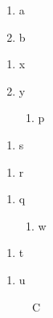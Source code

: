 \documentclass{article}
\begin{document}
\begin{enumerate}[label=(\alph*)]\item a\label{a1}\item b\label{a2}\end{enumerate}
\begin{enumerate}\item x\item y\begin{enumerate}[label=\roman*.]\item p\label{n1}\end{enumerate}\end{enumerate}
\begin{enumerate}[label=Step \arabic*, start=3]\item s\label{s1}\end{enumerate}
\begin{enumerate}[label=(\Alph*), ref=\Alph*]\item r\label{r1}\end{enumerate}
\begin{enumerate}[label=\arabic*)]\item q\label{q1}\begin{enumerate}\item w\label{q2}\end{enumerate}\end{enumerate}
\begin{enumerate}[label*=.\arabic*]\item t\label{t1}\end{enumerate}
\begin{enumerate}[label=\textbf{\alph*}]\item u\label{u1}\end{enumerate}
\begin{figure}\label{early}\caption{C}\label{late}\end{figure}
\end{document}

